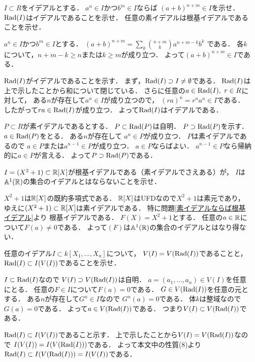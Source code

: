 \begin{prob}\label{素イデアルならば根基イデアル}
  $I\subset R$をイデアルとする．
  $a^n \in I$かつ$b^m\in I$ならば
  $(a+b)^{n+m} \in I$を示せ．
  $\mathrm{Rad}(I)$はイデアルであることを示せ．
  任意の素イデアルは根基イデアルであることを示せ．
\end{prob}
\begin{ans}
  $a^n \in I$かつ$b^m\in I$とする．
  $(a+b)^{n+m} = \sum_{k} \binom{n+m}{k} a^{n+m-k}b^k$
  である．
  各$k$について，$n+m-k \ge n$または$k \ge m$が成り立つ．
  よって$(a+b)^{n+m} \in I$である．

  $\mathrm{Rad}(I)$がイデアルであることを示す．
  まず，$\mathrm{Rad}(I) \supset I \ne \emptyset $である．
  $\mathrm{Rad}(I)$は上で示したことから和について閉じている．
  さらに任意の$a \in \mathrm{Rad}(I), \ r\in R$に対して，
  ある$n$が存在して$ a^n \in I$が成り立つので，
  $ (ra)^n = r^n a^n \in I $である．
  したがって$ra \in \mathrm{Rad}(I)$が成り立つ．
  よって$\mathrm{Rad}(I)$はイデアルである．

  $P\subset R$が素イデアルであるとする．
  $P \subset \mathrm{Rad}(P)$は自明．
  $P \supset \mathrm{Rad}(P)$を示す．
  $ a\in \mathrm{Rad}(P)$をとる．
  ある$n$が存在して
  $ a^n \in P$が成り立つ．
  $P$は素イデアルであるので
  $a\in P$または$a^{n-1} \in P$が成り立つ．
  $a\in P$ならばよい．
  $a^{n-1} \in P$なら帰納的に$a\in P$が言える．
  よって$P \supset \mathrm{Rad}(P)$である．
\end{ans}

\begin{prob}
  $I = (X^2 + 1) \subset \mathbb{R}[X]$が根基イデアルである（素イデアルでさえある）が，
  $I$は$\mathbb{A}^1(\mathbb{R})$の集合のイデアルとはならないことを示せ．
\end{prob}
\begin{ans}
  $X^2 + 1$は$\mathbb{R}[X]$の既約多項式である．
  $\mathbb{R}[X]$はUFDなので$X^2+1$は素元であり，
  ゆえに$(X^2+1) \subset \mathbb{R}[X]$は素イデアルである．
  特に問題\ref{素イデアルならば根基イデアル}より
  根基イデアルである．
  $F(X) = X^2 + 1$とする．
  任意の$a \in \mathbb{R}$について$F(a) \ne 0$である．
  よって$(F)$は$\mathbb{A}^1(\mathbb{R})$の集合のイデアルとはなり得ない．
\end{ans}

\begin{prob}
  任意のイデアル$I \subset k[X_1,\dots,X_n]$について，
  $V(I) = V(\mathrm{Rad}(I))$であることと，
  $\mathrm{Rad}(I) \subset I(V(I))$であることを示せ．
\end{prob}
\begin{ans}
  $I \subset \mathrm{Rad}(I)$なので
  $V(I) \supset V(\mathrm{Rad}(I))$は自明．
  $a = (a_1, \dots , a_n) \in V(I)$を任意にとる．
  任意の$F\in I$について$F(a) = 0$である．
  $G \in V(\mathrm{Rad}(I))$を任意の元とする．
  ある$n$が存在して$G^n \in I$なので
  $G^n(a) = 0$である．
  体$k$は整域なので$G(a) = 0$である．
  よって$a \in V(\mathrm{Rad}(I))$である．
  つまり$V(I) \subset V(\mathrm{Rad}(I))$である．

  $\mathrm{Rad}(I) \subset I(V(I))$であること示す．
  上で示したことから$V(I) = V(\mathrm{Rad}(I))$なので
  $I(V(I)) = I(V(\mathrm{Rad}(I)))$である．
  よって本文中の性質(8)より
  $\mathrm{Rad}(I) \subset I(V(\mathrm{Rad}(I))) = I(V(I))$である．
\end{ans}
